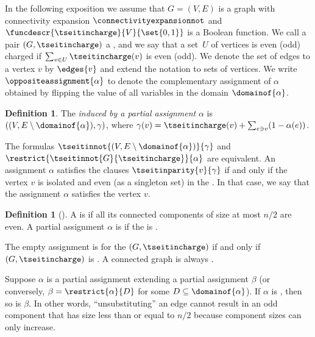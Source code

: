 \documentclass[11pt]{article}
\numberwithin{equation}{section}
\theoremstyle{definition}
\newtheorem{definition}[theorem]{Definition}
\theoremstyle{plain}
\begin{document}
In the following exposition we assume that $G=(V,E)$ is a graph with connectivity expansion $\connectivityexpansionnot$ and $\funcdescr{\tseitincharge}{V}{\set{0,1}}$ is a Boolean function. We call a pair $(G,\tseitincharge)$ a \introduceterm{\chargedgraph}, and we say that a %
set~$U$ of vertices
is even (odd) charged if $\sum_{v\in U}\tseitincharge(v)$ is even (odd).
We denote the set of edges  to a vertex $v$ by $\edges{v}$ and extend the notation to sets of vertices.
We write
  $\oppositeassignment{\alpha}$
  to denote the complementary assignment
  of $\alpha$
  obtained by flipping the value of all
  variables in the domain
  $\domainof{\alpha}$.

\begin{definition}
  \label{def:induced-graph}
  The \emph{\chargedgraph induced by a partial assignment} $\alpha$ is $((V,E\setminus \domainof{\alpha}),\gamma)$, where $\gamma(v) = \tseitincharge(v) + \sum_{e \ni v}(1 - \alpha(e))$.
\end{definition}

\begin{observation}
  \label{obs:induced-graph-and-assignments}
  The formulas $\tseitinnot{(V,E\setminus \domainof{\alpha})}{\gamma}$ and $\restrict{\tseitinnot{G}{\tseitincharge}}{\alpha}$ are equivalent. An assignment $\alpha$ satisfies the clauses $\tseitinparity{v}{\gamma}$ if and only if the vertex $v$ is isolated and even (as a singleton set) in the \inducedgraph{$\alpha$}. In that case, we say that the assignment $\alpha$ satisfies the vertex $v$.
\end{observation}

\begin{definition}[\nonsplittingassignment]
  \label{def:non-splitting-assignment} A \chargedgraph is \introduceterm{\Gnonsplittingnot} if all its connected components of size at most $n/2$ are even. A partial assignment $\alpha$ is \emph{\nonsplitting} if the \inducedgraph{$\alpha$} is \Gnonsplitting.
\end{definition}

\begin{observation}
 \label{obs:empty-assignment}
 The empty assignment is \nonsplitting for the \chargedgraph
 $(G,\tseitincharge)$ if and only if $(G,\tseitincharge)$ is \Gnonsplittingnot. A connected graph is always \Gnonsplittingnot.
\end{observation}

\begin{observation}
 \label{obs:restriction-non-splitting}
 Suppose $\alpha$ is a partial assignment extending a partial assignment $\beta$ (or conversely, $\beta = \restrict{\alpha}{D}$ for some $D \subseteq \domainof{\alpha}$). If $\alpha$ is \nonsplitting, then so is $\beta$. In other words, ``unsubstituting'' an edge cannot result in an odd component that has size less than or equal to $n/2$ because component sizes can only increase.
\end{observation}
\end{document}
